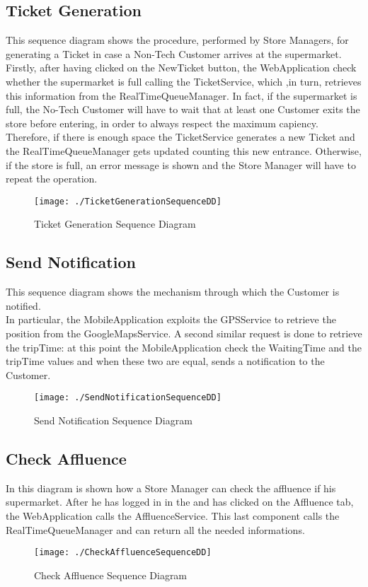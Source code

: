 \subsection{Ticket Generation}
This sequence diagram shows the procedure, performed by Store Managers, for generating a Ticket in case a Non-Tech Customer arrives at the supermarket.\\
Firstly, after having clicked on the NewTicket button, the WebApplication check whether the supermarket is full calling the TicketService, which ,in turn, retrieves this information from the RealTimeQueueManager. In fact, if the supermarket is full, the No-Tech Customer will have to wait that at least one Customer exits the store before entering, in order to always respect the maximum capiency. Therefore, if there is enough space the TicketService generates a new Ticket and the RealTimeQueueManager gets updated counting this new entrance. Otherwise, if the store is full, an error message is shown and the Store Manager will have to repeat the operation. 
\begin{figure}[H]
\centerline{\texttt{[image: ./TicketGenerationSequenceDD]}}
\caption{Ticket Generation Sequence Diagram}
\end{figure}


\subsection{Send Notification}
This sequence diagram shows the mechanism through which the Customer is notified. \\
In particular, the MobileApplication exploits the GPSService to retrieve the position from the GoogleMapsService. A second similar request is done to retrieve the tripTime: at this point the MobileApplication check the WaitingTime and the tripTime values and when these two are equal, sends a notification to the Customer.
\begin{figure}[H]
\centerline{\texttt{[image: ./SendNotificationSequenceDD]}}
\caption{Send Notification Sequence Diagram}
\end{figure}



\subsection{Check Affluence}
In this diagram is shown how a Store Manager can check the affluence if his supermarket. After he has logged in in the and has clicked on the Affluence tab, the WebApplication calls the AffluenceService. This last component calls the RealTimeQueueManager and can return all the needed informations.
\begin{figure}[H]
\centerline{\texttt{[image: ./CheckAffluenceSequenceDD]}}
\caption{Check Affluence Sequence Diagram}
\end{figure}



